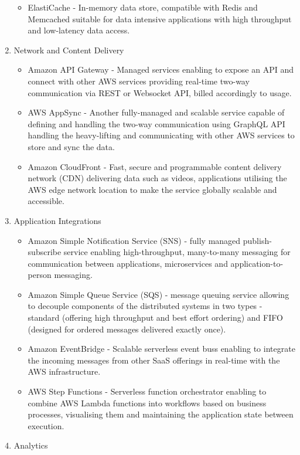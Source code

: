 \begin{enumerate}
\begin{itemize}
       \item ElastiCache - In-memory data store, compatible with Redis and Memcached suitable for data intensive applications with high throughput and low-latency data access.
   \end{itemize}
   \item Network and Content Delivery
   \begin{itemize}
       \item Amazon API Gateway - Managed services enabling to expose an API and connect with other AWS services providing real-time two-way communication via REST or Websocket API, billed accordingly to usage.
       \item AWS AppSync - Another fully-managed and scalable service capable of defining and handling the two-way communication using GraphQL API handling the heavy-lifting and communicating with other AWS services to store and sync the data.
       \item Amazon CloudFront - Fast, secure and programmable content delivery network (CDN) delivering data such as videos, applications utilising the AWS edge network location to make the service globally scalable and accessible.
   \end{itemize}
   \item Application Integrations
   \begin{itemize}
       \item Amazon Simple Notification Service (SNS) - fully managed publish-subscribe service enabling high-throughput, many-to-many messaging for communication between applications, microservices and application-to-person messaging.
       \item Amazon Simple Queue Service (SQS) - message queuing service allowing to decouple components of the distributed systems in two types - standard (offering high throughput and best effort ordering) and FIFO (designed for ordered messages delivered exactly once).
       \item Amazon EventBridge - Scalable serverless event buss enabling to integrate the incoming messages from other SaaS offerings in real-time with the AWS infrastructure.
       \item AWS Step Functions - Serverless function orchestrator enabling to combine AWS Lambda functions into workflows based on business processes, visualising them and maintaining the application state between execution.
   \end{itemize}
   \item Analytics
   \begin{itemize}

\end{itemize}
\end{enumerate}
